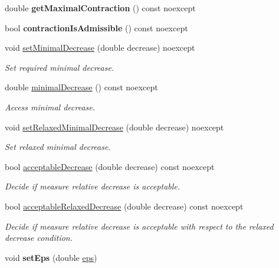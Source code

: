 \begin{DoxyCompactItemize}
\item 
double {\bfseries get\+Maximal\+Contraction} () const noexcept\hypertarget{classSpacy_1_1Mixin_1_1ContractionRate_a08922422dce735b2aee40c57b1c2ced6}{}\label{classSpacy_1_1Mixin_1_1ContractionRate_a08922422dce735b2aee40c57b1c2ced6}

\item 
bool {\bfseries contraction\+Is\+Admissible} () const noexcept\hypertarget{classSpacy_1_1Mixin_1_1ContractionRate_aeae43593fd23f40159ed9f00a3cde399}{}\label{classSpacy_1_1Mixin_1_1ContractionRate_aeae43593fd23f40159ed9f00a3cde399}

\item 
void \hyperlink{classSpacy_1_1Mixin_1_1DecreaseCondition_aeebecf3cbbbb6cd2631abe7fd3888aad}{set\+Minimal\+Decrease} (double decrease) noexcept
\begin{DoxyCompactList}\small\item\em Set required minimal decrease. \end{DoxyCompactList}\item 
double \hyperlink{classSpacy_1_1Mixin_1_1DecreaseCondition_a8e0fba73f86381f6c7479f1a0d524be6}{minimal\+Decrease} () const noexcept
\begin{DoxyCompactList}\small\item\em Access minimal decrease. \end{DoxyCompactList}\item 
void \hyperlink{classSpacy_1_1Mixin_1_1DecreaseCondition_a396bb6f45eb4533e07fa1d174d84ca9f}{set\+Relaxed\+Minimal\+Decrease} (double decrease) noexcept
\begin{DoxyCompactList}\small\item\em Set relaxed minimal decrease. \end{DoxyCompactList}\item 
bool \hyperlink{classSpacy_1_1Mixin_1_1DecreaseCondition_a11426318e1cc6d06b6251636d2a14389}{acceptable\+Decrease} (double decrease) const noexcept
\begin{DoxyCompactList}\small\item\em Decide if measure relative decrease is acceptable. \end{DoxyCompactList}\item 
bool \hyperlink{classSpacy_1_1Mixin_1_1DecreaseCondition_a343f1fa78010d07db49f36da46495ad5}{acceptable\+Relaxed\+Decrease} (double decrease) const noexcept
\begin{DoxyCompactList}\small\item\em Decide if measure relative decrease is acceptable with respect to the relaxed decrease condition. \end{DoxyCompactList}\item 
void {\bfseries set\+Eps} (double \hyperlink{classSpacy_1_1Mixin_1_1Eps_a40e2ba8f3abd2b5370ef41238cfaaf8b}{eps})\hypertarget{classSpacy_1_1Mixin_1_1Eps_a1bbfd62541610d5d80f2782ab77158e4}{}\label{classSpacy_1_1Mixin_1_1Eps_a1bbfd62541610d5d80f2782ab77158e4}


\end{DoxyCompactItemize}
